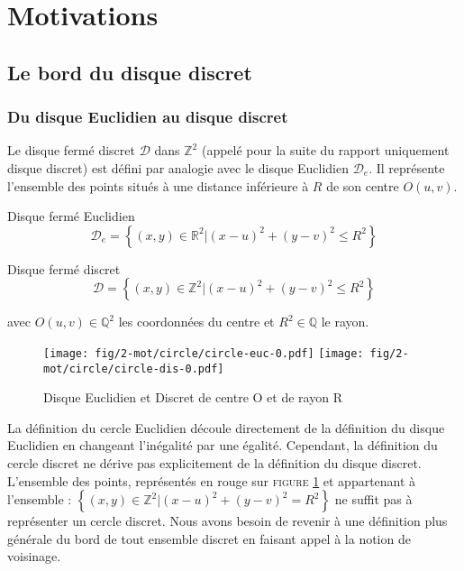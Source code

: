 \section{Motivations}

\subsection{Le bord du disque discret}

\subsubsection{Du disque Euclidien au disque discret}


Le  disque fermé discret $\mathcal{D}$ dans $\mathbb{Z}^{2}$ (appelé pour la suite du rapport uniquement disque discret) est défini par analogie avec le disque Euclidien $\mathcal{D}_e$. Il représente l'ensemble des points situés à une distance inférieure à $R$ de son centre $O(u,v)$.


\begin{Definition}{Disque fermé Euclidien}
\label{def:disk-euc}
 $$\mathcal{D}_e =  \left\{ (x,y) \in \mathbb{R}^{2} |  (x - u)^2 + (y - v)^2 \leq R^2 \right\}$$
\end{Definition}

\begin{Definition}{Disque fermé discret}
\label{def:disk-dis}
  $$\mathcal{D} =  \left\{ (x,y) \in \mathbb{Z}^{2} |  (x - u)^2 + (y - v)^2 \leq R^2 \right\}$$
  
  avec $O(u,v) \in \mathbb{Q}^{2}$ les coordonnées du centre et $R^2 \in \mathbb{Q}$ le rayon.\\
\end{Definition}

\begin{figure}[H]
  \centering
  \texttt{[image: fig/2-mot/circle/circle-euc-0.pdf]}
  \texttt{[image: fig/2-mot/circle/circle-dis-0.pdf]}
  \caption{Disque Euclidien et Discret de centre O et de rayon R}
\label{fig:disk}
\end{figure}

La définition du cercle Euclidien découle directement de la définition du disque Euclidien en changeant l'inégalité par une égalité. Cependant, la définition du cercle discret ne dérive pas explicitement de la définition du disque discret. L'ensemble des points, représentés en rouge sur \textsc{figure} \ref{fig:disk} et appartenant à l'ensemble : $\left\{ (x,y) \in \mathbb{Z}^{2} |  (x - u)^2 + (y - v)^2 = R^2 \right\}$ ne suffit pas à représenter un cercle discret. Nous avons besoin de revenir à une définition plus générale du bord de tout ensemble discret en faisant appel à la notion de voisinage.\\

